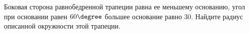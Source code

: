 \begin{ex}
	\begin{condition}
		Боковая сторона равнобедренной трапеции равна ее меньшему основанию, угол при основании равен \( 60  \degree\) большее основание равно \( 30 \). Найдите радиус описанной окружности этой трапеции.
	\end{condition}
\end{ex}